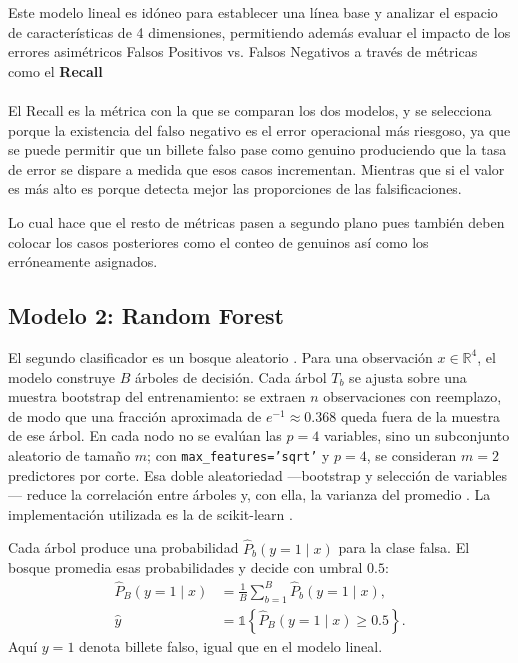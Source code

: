 \documentclass[conference]{IEEEtran}
\begin{document}
	Este modelo lineal es idóneo para establecer una línea base y analizar el espacio de características de 4 dimensiones, permitiendo además evaluar el impacto de los errores asimétricos Falsos Positivos vs. Falsos Negativos a través de métricas como el \textbf{Recall}
	\\	\\	
	El Recall es la métrica con la que se comparan los dos modelos, y se selecciona porque la existencia del falso negativo es el error operacional más riesgoso, ya que se puede permitir que un billete falso pase como genuino produciendo que la tasa de error se dispare a medida que esos casos incrementan. Mientras que si el valor es más alto es porque detecta mejor las proporciones de las falsificaciones. 
	
	Lo cual hace que el resto de métricas pasen a segundo plano pues también deben colocar los casos posteriores como el conteo de genuinos así como los erróneamente asignados.
	
    \subsection{Modelo 2: Random Forest}
    \label{sec:rf}
    
    El segundo clasificador es un bosque aleatorio \cite{breiman2001random}. Para una observación $x\in\mathbb{R}^4$, el modelo construye $B$ árboles de decisión. Cada árbol $T_b$ se ajusta sobre una muestra bootstrap del entrenamiento: se extraen $n$ observaciones con reemplazo, de modo que una fracción aproximada de $e^{-1}\approx 0.368$ queda fuera de la muestra de ese árbol. En cada nodo no se evalúan las $p=4$ variables, sino un subconjunto aleatorio de tamaño $m$; con \texttt{max\_features='sqrt'} y $p=4$, se consideran $m=2$ predictores por corte. Esa doble aleatoriedad —bootstrap y selección de variables— reduce la correlación entre árboles y, con ella, la varianza del promedio \cite{hastie2009elements}. La implementación utilizada es la de scikit-learn \cite{pedregosa2011scikit}.
    
   Cada árbol produce una probabilidad $\hat{P}_b(y=1\mid x)$ para la clase falsa. El bosque promedia esas probabilidades y decide con umbral $0.5$:
    \begin{align}
    	\hat{P}_B(y=1\mid x) &= \frac{1}{B}\sum_{b=1}^{B}\hat{P}_b(y=1\mid x), \nonumber \\
    	\hat{y} &= \mathbb{1}\left\{\hat{P}_B(y=1\mid x)\ge 0.5\right\}.
    	\label{eq:rf-prob}
    \end{align}
    Aquí $y=1$ denota billete falso, igual que en el modelo lineal.
    
\end{document}
